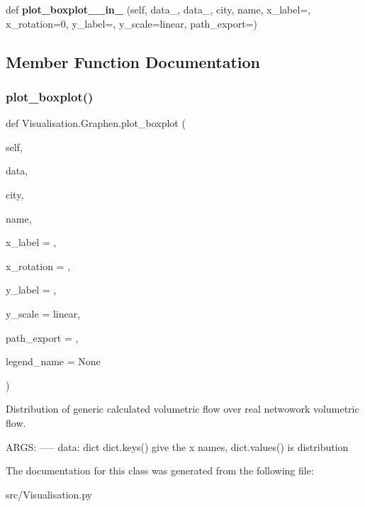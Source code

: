 \begin{DoxyCompactItemize}
\item 
\mbox{\label{class_visualisation_1_1_graphen_aa47c1f5f8ab84e7146c47fa075e7b49e}} 
def {\bfseries plot\+\_\+boxplot\+\_\+\_\+in\+\_} (self, data\+\_, data\+\_, city, name, x\+\_\+label=\textquotesingle{}\textquotesingle{}, x\+\_\+rotation=0, y\+\_\+label=\textquotesingle{}\textquotesingle{}, y\+\_\+scale=\textquotesingle{}linear\textquotesingle{}, path\+\_\+export=\textquotesingle{}\textquotesingle{})
\end{DoxyCompactItemize}


\subsection{Member Function Documentation}
\mbox{\label{class_visualisation_1_1_graphen_a8a8fc5a2bc67e8e55cc6c9335448cd7a}} 
\subsubsection{\texorpdfstring{plot\+\_\+boxplot()}{plot\_boxplot()}}
{\footnotesize\ttfamily def Visualisation.\+Graphen.\+plot\+\_\+boxplot (\begin{DoxyParamCaption}\item[{}]{self,  }\item[{}]{data,  }\item[{}]{city,  }\item[{}]{name,  }\item[{}]{x\+\_\+label = {\ttfamily \textquotesingle{}\textquotesingle{}},  }\item[{}]{x\+\_\+rotation = {},  }\item[{}]{y\+\_\+label = {\ttfamily \textquotesingle{}\textquotesingle{}},  }\item[{}]{y\+\_\+scale = {\ttfamily \textquotesingle{}linear\textquotesingle{}},  }\item[{}]{path\+\_\+export = {\ttfamily \textquotesingle{}\textquotesingle{}},  }\item[{}]{legend\+\_\+name = {\ttfamily None} }\end{DoxyParamCaption})}

\begin{DoxyVerb}Distribution of generic calculated volumetric flow over real
netwowork volumetric flow.

ARGS:
-----
data: dict
    dict.keys() give the x names, dict.values() is distribution
\end{DoxyVerb}
 

The documentation for this class was generated from the following file\+:\begin{DoxyCompactItemize}
\item 
src/Visualisation.\+py\end{DoxyCompactItemize}
